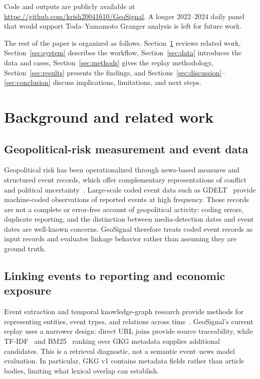 \documentclass[10pt,a4paper,twocolumn]{article}
\begin{document}
Code and outputs are publicly available at \url{https://github.com/krish20041610/GeoSignal}. A longer 2022--2024 daily panel that would support Toda--Yamamoto Granger analysis is left for future work.

The rest of the paper is organized as follows. Section~\ref{sec:related} reviews related work, Section~\ref{sec:system} describes the workflow, Section~\ref{sec:data} introduces the data and cases, Section~\ref{sec:methods} gives the replay methodology, Section~\ref{sec:results} presents the findings, and Sections~\ref{sec:discussion}--\ref{sec:conclusion} discuss implications, limitations, and next steps.

\section{Background and related work}\label{sec:related}

\subsection{Geopolitical-risk measurement and event data}

Geopolitical risk has been operationalized through news-based measures and structured event records, which offer complementary representations of conflict and political uncertainty~\cite{CaldaraIacoviello2022,PLOVER2023}. Large-scale coded event data such as GDELT~\cite{LeetaruSchrodt2013} provide machine-coded observations of reported events at high frequency. Those records are not a complete or error-free account of geopolitical activity: coding errors, duplicate reporting, and the distinction between media-detection dates and event dates are well-known concerns. GeoSignal therefore treats coded event records as input records and evaluates linkage behavior rather than assuming they are ground truth.

\subsection{Linking events to reporting and economic exposure}

Event extraction and temporal knowledge-graph research provide methods for representing entities, event types, and relations across time~\cite{MAVEN2020,MAVENERE2022,TIMERS2021,KnowEvolve2017,REN2020}. GeoSignal's current replay uses a narrower design: direct URL joins provide source traceability, while TF-IDF~\cite{SaltonBuckley1988} and BM25~\cite{RobertsonZaragoza2009} ranking over GKG metadata supplies additional candidates. This is a retrieval diagnostic, not a semantic event--news model evaluation. In particular, GKG v1 contains metadata fields rather than article bodies, limiting what lexical overlap can establish.
\end{document}
